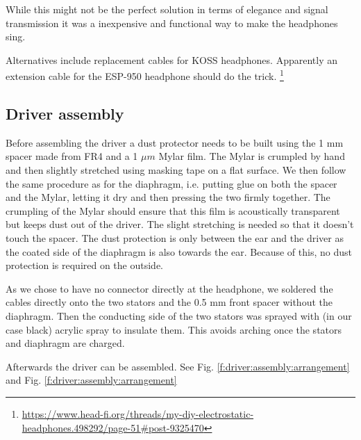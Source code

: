 \documentclass{article}
\begin{document}
While this might not be the perfect solution in terms of elegance and signal transmission it was a inexpensive and functional way to make the headphones sing.

Alternatives include replacement cables for KOSS headphones. Apparently an extension cable for the ESP-950 headphone should do the trick. \footnote{\url{https://www.head-fi.org/threads/my-diy-electrostatic-headphones.498292/page-51#post-9325470}}


\subsection{Driver assembly}
\label{s:driver:assembly}
Before assembling the driver a dust protector needs to be built using the 1 mm spacer made from FR4 and a 1 $\mu m$ Mylar film. The Mylar is crumpled by hand and then slightly stretched using masking tape on a flat surface. We then follow the same procedure as for the diaphragm, i.e. putting glue on both the spacer and the Mylar, letting it dry and then pressing the two firmly together. The crumpling of the Mylar should ensure that this film is acoustically transparent but keeps dust out of the driver. The slight stretching is needed so that it doesn't touch the spacer. The dust protection is only between the ear and the driver as the coated side of the diaphragm is also towards the ear. Because of this, no dust protection is required on the outside.

As we chose to have no connector directly at the headphone, we soldered the cables directly onto the two stators and the 0.5 mm front spacer without the diaphragm. Then the conducting side of the two stators was sprayed with (in our case black) acrylic spray to insulate them. This avoids arching once the stators and diaphragm are charged.

Afterwards the driver can be assembled. See Fig. \ref{f:driver:assembly:arrangement} and Fig. \ref{f:driver:assembly:arrangement}
\end{document}
